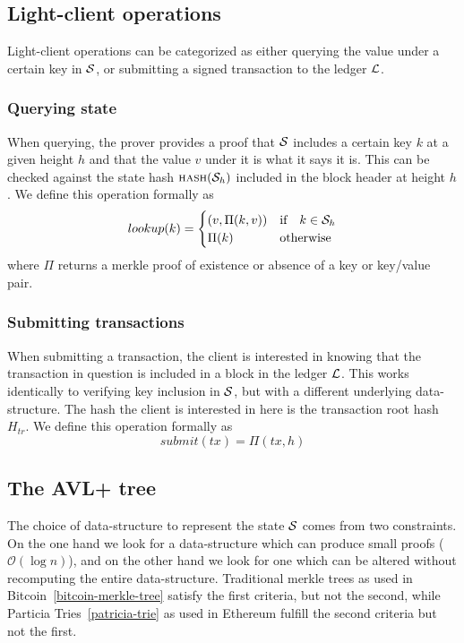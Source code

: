 \subsection{Light-client operations}

Light-client operations can be categorized as either querying the value under a
certain key in $\mathcal{S}$, or submitting a signed transaction to the ledger
$\mathcal{L}$.

\subsubsection{Querying state}

When querying, the prover provides a proof that $\mathcal{S}$ includes a certain key
$k$ at a given height $h$ and that the value $v$ under it is what it says it
is. This can be checked against the state hash $\text{\normalfont\scshape hash}(\mathcal{S}_h)$ included in the
block header at height $h$. We define this operation formally as
\[
    lookup(k) = \begin{cases}
        (v, \Pi(k, v))     & \text{if} \quad k \in \mathcal{S}_h \\
        \Pi(k)             & \text{otherwise}
    \end{cases}
\]
where $\Pi$ returns a merkle proof of existence or absence of a key or
key/value pair.

\subsubsection{Submitting transactions}

When submitting a transaction, the client is interested in knowing that the
transaction in question is included in a block in the ledger $\mathcal{L}$. This
works identically to verifying key inclusion in $\mathcal{S}$, but with a different
underlying data-structure. The hash the client is interested in here is the
transaction root hash $H_{tr}$. We define this operation formally as
\[
    submit(tx) = \Pi(tx, h)
\]

\subsection{The AVL+ tree}

The choice of data-structure to represent the state $\mathcal{S}$ comes from two
constraints.  On the one hand we look for a data-structure which can produce
small proofs ($\mathcal{O}(\log n)$), and on the other hand we look for one
which can be altered without recomputing the entire data-structure. Traditional
merkle trees as used in Bitcoin~\ref{bitcoin-merkle-tree} satisfy the first
criteria, but not the second, while Particia Tries~\ref{patricia-trie} as used
in Ethereum fulfill the second criteria but not the first.
